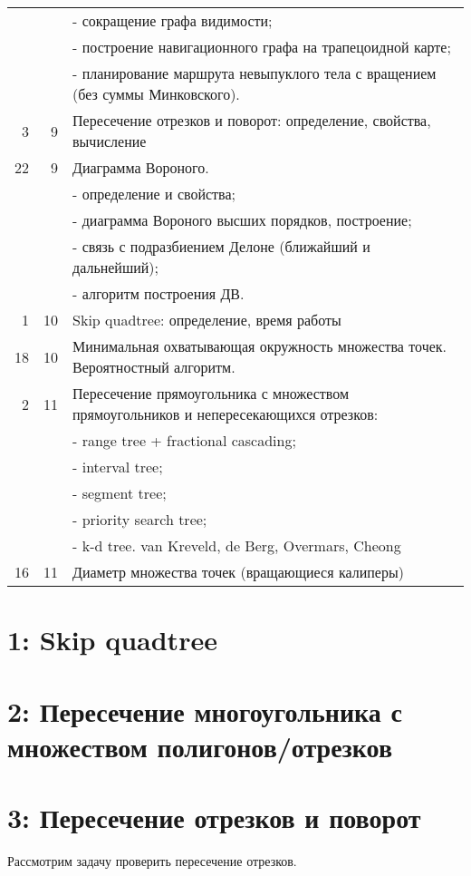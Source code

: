 \documentclass[11pt]{article}
\begin{document}
\begin{center}
\begin{tabular}{rrl}
 &  & - сокращение графа видимости;\\
 &  & - построение навигационного графа на трапецоидной карте;\\
 &  & - планирование маршрута невыпуклого тела с вращением (без суммы Минковского).\\
3 & 9 & Пересечение отрезков и поворот: определение, свойства, вычисление\\
22 & 9 & Диаграмма Вороного.\\
 &  & - определение и свойства;\\
 &  & - диаграмма Вороного высших порядков, построение;\\
 &  & - связь с подразбиением Делоне (ближайший и дальнейший);\\
 &  & - алгоритм построения ДВ.\\
1 & 10 & Skip quadtree: определение, время работы\\
18 & 10 & Минимальная охватывающая окружность множества точек. Вероятностный алгоритм.\\
2 & 11 & Пересечение прямоугольника с множеством прямоугольников и непересекающихся отрезков:\\
 &  & - range tree + fractional cascading;\\
 &  & - interval tree;\\
 &  & - segment tree;\\
 &  & - priority search tree;\\
 &  & - k-d tree.        van Kreveld, de Berg, Overmars, Cheong\\
16 & 11 & Диаметр множества точек (вращающиеся калиперы)\\
\hline
\end{tabular}
\end{center}
\section{{\bfseries{}} 1:  Skip quadtree}
\label{sec-3}
\section{{\bfseries{}} 2:  Пересечение многоугольника с множеством полигонов/отрезков}
\label{sec-4}
\section{{\bfseries{}} 3:  Пересечение отрезков и поворот}
\label{sec-5}
Рассмотрим задачу проверить пересечение отрезков.
\end{document}
